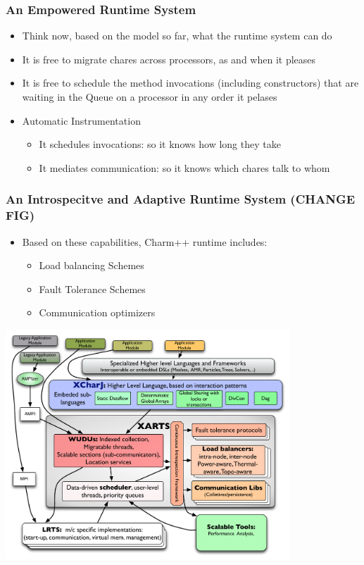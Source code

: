 

\begin{frame}[fragile]
\frametitle{An Empowered Runtime System}

\begin{itemize}
\item Think now, based on the model so far, what the runtime system
  can do
\item It is free to migrate chares across processors, as and when it pleases
\item It is free to schedule the method invocations (including
  constructors) that are waiting in the Queue on a processor in any
  order it pelases
\item Automatic Instrumentation
\begin{itemize}
\item It schedules invocations: so it knows how long they take
\item It mediates communication: so it knows which chares talk to whom
\end{itemize}

\end{itemize}

\end{frame}

\begin{frame}[fragile]
\frametitle{An Introspecitve and Adaptive Runtime System (CHANGE FIG)}
\begin{itemize}
\item Based on these capabilities, Charm++ runtime includes:
\begin{itemize}
\item Load balancing Schemes
\item Fault Tolerance Schemes
\item Communication optimizers
\end{itemize}
\end{itemize}

\includegraphics[width=0.8\textwidth]{figures/arts}

\end{frame}

